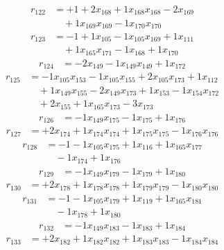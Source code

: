 \[\begin{aligned}
r_{122} &= + 1 + 2 x_{168} + 1 x_{168} x_{168} - 2 x_{169} \\
 &\quad + 1 x_{169} x_{169} - 1 x_{170} x_{170}
\end{aligned}\]
\[\begin{aligned}
r_{123} &= - 1 + 1 x_{105} - 1 x_{105} x_{169} + 1 x_{111} \\
 &\quad + 1 x_{165} x_{171} - 1 x_{168} + 1 x_{170}
\end{aligned}\]
\[\begin{aligned}
r_{124} &= - 2 x_{149} - 1 x_{149} x_{149} + 1 x_{172}
\end{aligned}\]
\[\begin{aligned}
r_{125} &= - 1 x_{105} x_{153} - 1 x_{105} x_{155} + 2 x_{105} x_{173} + 1 x_{112} \\
 &\quad + 1 x_{149} x_{155} - 2 x_{149} x_{173} + 1 x_{153} - 1 x_{154} x_{172} \\
 &\quad + 2 x_{155} + 1 x_{165} x_{173} - 3 x_{173}
\end{aligned}\]
\[\begin{aligned}
r_{126} &= - 1 x_{149} x_{175} - 1 x_{175} + 1 x_{176}
\end{aligned}\]
\[\begin{aligned}
r_{127} &= + 2 x_{174} + 1 x_{174} x_{174} + 1 x_{175} x_{175} - 1 x_{176} x_{176}
\end{aligned}\]
\[\begin{aligned}
r_{128} &= - 1 - 1 x_{105} x_{175} + 1 x_{116} + 1 x_{165} x_{177} \\
 &\quad - 1 x_{174} + 1 x_{176}
\end{aligned}\]
\[\begin{aligned}
r_{129} &= - 1 x_{149} x_{179} - 1 x_{179} + 1 x_{180}
\end{aligned}\]
\[\begin{aligned}
r_{130} &= + 2 x_{178} + 1 x_{178} x_{178} + 1 x_{179} x_{179} - 1 x_{180} x_{180}
\end{aligned}\]
\[\begin{aligned}
r_{131} &= - 1 - 1 x_{105} x_{179} + 1 x_{119} + 1 x_{165} x_{181} \\
 &\quad - 1 x_{178} + 1 x_{180}
\end{aligned}\]
\[\begin{aligned}
r_{132} &= - 1 x_{149} x_{183} - 1 x_{183} + 1 x_{184}
\end{aligned}\]
\[\begin{aligned}
r_{133} &= + 2 x_{182} + 1 x_{182} x_{182} + 1 x_{183} x_{183} - 1 x_{184} x_{184}
\end{aligned}\]
